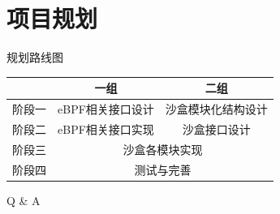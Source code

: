 \documentclass[UTF8,aspectratio=169,fontset=macnew,xcolor=table]{ctexbeamer}
\begin{document}
\section{项目规划}

\begin{frame}{规划路线图}
\begin{table}[H]
    \begin{tabular}{|c|c|c|}
    \hline 
     & \textbf{一组}     &  \textbf{二组} \\\hline
    阶段一 & eBPF相关接口设计 & 沙盒模块化结构设计 \\\hline
    阶段二 & eBPF相关接口实现 & 沙盒接口设计   \\\hline
    阶段三 & \multicolumn{2}{c|}{沙盒各模块实现}  \\\hline
    阶段四 & \multicolumn{2}{c|}{测试与完善}  \\\hline
    \end{tabular}
\end{table}

\end{frame}

\begin{frame}
    \centering
    \Huge Q \& A
\end{frame}
\end{document}
